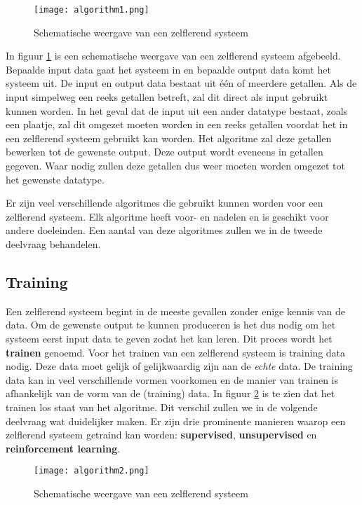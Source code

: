 \begin{figure}[h]
  \centering
    \texttt{[image: algorithm1.png]}
  \caption{Schematische weergave van een zelflerend systeem}
  \label{fig:algorithm1}
\end{figure}

In figuur \ref{fig:algorithm1}  is een schematische weergave van een zelflerend systeem afgebeeld. Bepaalde input data gaat het systeem in en bepaalde output data komt het systeem uit. De input en output data bestaat uit \'e\'en of meerdere getallen. Als de input simpelweg een reeks getallen betreft, zal dit direct als input gebruikt kunnen worden. In het geval dat de input uit een ander datatype bestaat, zoals een plaatje, zal dit omgezet moeten worden in een reeks getallen voordat het in een zelflerend systeem gebruikt kan worden. Het algoritme zal deze getallen bewerken tot de gewenste output. Deze output wordt eveneens in getallen gegeven. Waar nodig zullen deze getallen dus weer moeten worden omgezet tot het gewenste datatype.

Er zijn veel verschillende algoritmes die gebruikt kunnen worden voor een zelflerend systeem. Elk algoritme heeft voor- en nadelen en is geschikt voor andere doeleinden. Een aantal van deze algoritmes zullen we in de tweede deelvraag behandelen. 

\subsection{Training}

Een zelflerend systeem begint in de meeste gevallen zonder enige kennis van de data. Om de gewenste output te kunnen produceren is het dus nodig om het systeem eerst input data te geven zodat het kan leren. Dit proces wordt het \textbf{trainen} genoemd. Voor het trainen van een zelflerend systeem is training data nodig. Deze data moet gelijk of gelijkwaardig zijn aan de \textit{echte} data. De training data kan in veel verschillende vormen voorkomen en de manier van trainen is afhankelijk van de vorm van de (training) data. In figuur \ref{fig:algorithm2}  is te zien dat het trainen los staat van het algoritme. Dit verschil zullen we in de volgende deelvraag wat duidelijker maken. 
Er zijn drie prominente manieren waarop een zelflerend systeem getraind kan worden: \textbf{supervised}, \textbf{unsupervised} en \textbf{reinforcement learning}.

\begin{figure}[h]
  \centering
    \texttt{[image: algorithm2.png]}
  \caption{Schematische weergave van een zelflerend systeem}
  \label{fig:algorithm2}
\end{figure}

